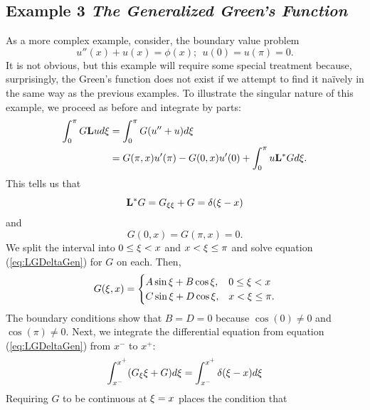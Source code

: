 \subsection{Example 3 \textit{The Generalized Green's Function}}
    As a more complex example, consider, the boundary value problem
    \begin{equation}\label{eq:Gen1}
        u''(x) + u(x) = \phi(x);\ \ u(0) = u(\pi) = 0.
    \end{equation}
    It is not obvious, but this example will require some special treatment because, surprisingly, the Green's function does not exist if we attempt to find it na{\"i}vely in the same way as the previous examples. To illustrate the singular nature of this example, we proceed as before and integrate by parts:
    \begin{equation*}
        \begin{split}
            \int_{0}^{\pi} G\mathrm{\bf{L}} u d\xi &= \int_{0}^{\pi} G(u''+u) d\xi\\
            &= G(\pi,x)u'(\pi) - G(0,x)u'(0) + \int_{0}^{\pi} u\mathrm{\bf{L}}^* G d\xi.
        \end{split}
    \end{equation*}
    This tells us that
    \begin{equation}\label{eq:LGDeltaGen}
        \mathrm{\bf{L^*}} G = G_{\xi\xi} + G = \delta(\xi-x)
    \end{equation}
    and 
    \begin{equation*}
        G(0,x)=G(\pi,x) = 0.
    \end{equation*}
    We split the interval into \(0\leq \xi < x\) and \(x < \xi \leq \pi\) and solve equation (\ref{eq:LGDeltaGen}) for \(G\) on each. Then,
    \begin{equation*}
        G(\xi,x) = \begin{cases}
            A\sin\xi + B\cos\xi, & 0\leq \xi < x\\
            C\sin\xi + D\cos\xi, & x < \xi \leq \pi.
        \end{cases}
    \end{equation*}
    The boundary conditions show that \(B=D=0\) because \(\cos(0)\neq 0\) and \(\cos(\pi)\neq0\). Next, we integrate the differential equation from equation (\ref{eq:LGDeltaGen}) from \(x^-\) to \(x^+\):
    \begin{equation}\label{eq:GenGInt}
        \int_{x^-}^{x^+} (G_\xi\xi + G) d\xi = \int_{x^-}^{x^+} \delta(\xi-x)d\xi
    \end{equation}
    Requiring \(G\) to be continuous at \(\xi=x\) places the condition that
